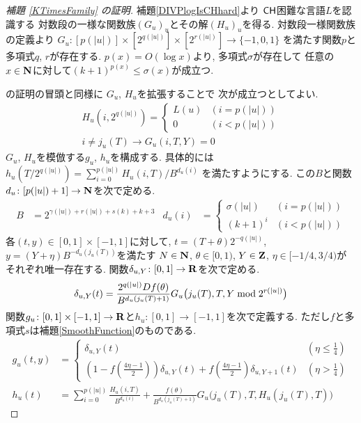  \begin{proof}[\rm 補題 \ref{KTimesFamily} の証明]
  補題\ref{DIVPlogIsCHhard}より
  $\mathsf{CH}$困難な言語$L$を認識する
  対数段の一様な関数族$(G_u)_u$とその解$(H_u)_u$を得る.
  対数段一様関数族の定義より 
  $G_u \colon [p(|u|)] \times [2^{q(|u|)}] \times [2^{r(|u|)}] \to \{-1, 0, 1\}$
  を満たす関数$p$と多項式$q$, $r$が存在する. 
  $p (x) = O (\log x)$より, 
  多項式$\sigma$が存在して
  任意の$x \in \mathbf N$に対して$(k+1)^{p(x)} \le \sigma(x)$が成立つ. 

  \cite[補題4.1]{kawamura2010lipschitz}の証明の冒頭と同様に
  $G _u$, $H _u$を拡張することで
  次が成立つとしてよい.
  \begin{gather}
   H_u(i, 2^{q(|u|)}) = \begin{cases}
			L(u) & (i=p(|u|)) \\
			0 & (i<p(|u|))
			\end{cases}
   \\
   i \not = j_u(T)  \to G_u(i, T, Y) = 0 
  \end{gather}
  $G _u$, $H _u$を模倣する$g _u$, $h _u$を構成する.
  具体的には$h_u(T/2^{q(|u|)}) = \sum^{p(|u|)}_{i = 0}H_u(i, T)/B^{d_u(i)}$
  を満たすようにする. この$B$と関数$d_u \colon [p(|u|)+1] \to \mathbf N$を次で定める. 
  \begin{align}
   B &= 2^{\gamma(|u|) + r(|u|) + s(k) + k + 3}
   &
   d_u(i) &= 
   \begin{cases}
    \sigma(|u|) & (i=p(|u|)) 
    \\
    (k+1)^i & (i<p(|u|))
   \end{cases}
  \end{align}
各$(t, y) \in [0,1] \times [-1, 1]$に対して,
$t = (T + \theta)2^{-q(|u|)}$, $y = (Y + \eta)B^{-d_u(j_u(T))}$を満たす
$N \in \mathbf N$, 
$\theta \in [0,1)$, 
$Y \in \mathbf Z$, 
$\eta \in [-1/4, 3/4)$が
それぞれ唯一存在する.
関数$\delta_{u,Y} \colon [0,1] \to \mathbf R$を次で定める. 
 \begin{equation} \label{eq:delta}
  \delta_{u, Y} (t) = \frac{2^{q(|u|)} D f(\theta)}{B^{d_u(j_u(T)+1)}} 
   G_u \bigl( j_u(T), T, Y \bmod 2^{r(|u|)} \bigr)
 \end{equation}
関数$
g _u \colon [0, 1] \times [-1, 1] \to \mathbf R
$と$
h _u \colon [0, 1] \to [-1, 1]
$を次で定義する.
ただし$f$と多項式$s$は補題\ref{SmoothFunction}のものである.
  \begin{align}
  \label{eq:gu}
  g_u(t,y) 
  &= \begin{cases}
     \delta_{u, Y}(t)
     & (\eta \le \frac 1 4)
     \\
     ( 1-f ( \frac{4\eta-1}{2})) \delta_{u, Y}(t)
     + f ( \frac{4\eta-1}{2}) \delta_{u,Y+1}(t)
     & (\eta > \frac 1 4)
    \end{cases}
   \\
  h_u(t) 
   &= \sum^{p(|u|)}_{i=0} \frac{H_u(i, T)}{B^{d_u(i)}}  
  + \frac{f(\theta)}{B^{d_u(j_u(T)+1)}} G_u \bigl( j_u(T), T, H_u(j_u(T), T) \bigr) 
  \label{eq:hu}
  \end{align}


\end{proof}

